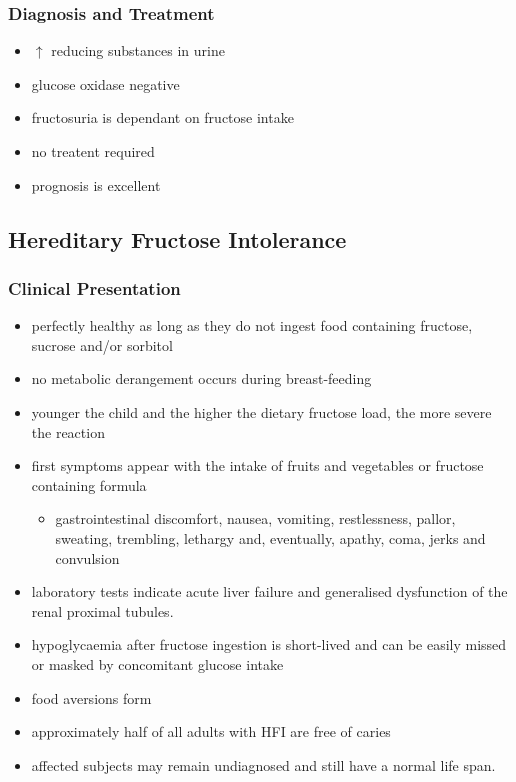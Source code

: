 \documentclass{scrartcl}
\begin{document}
\subsubsection{Diagnosis and Treatment}
\label{sec:org37c1d7e}
\begin{itemize}
\item \(\uparrow\) reducing substances in urine
\item glucose oxidase negative
\item fructosuria is dependant on fructose intake
\item no treatent required
\item prognosis is excellent
\end{itemize}

\subsection{Hereditary Fructose Intolerance}
\label{sec:orgbb3ffac}
\subsubsection{Clinical Presentation}
\label{sec:orgba35513}
\begin{itemize}
\item perfectly healthy as long as they do not ingest food containing fructose, sucrose and/or sorbitol
\item no metabolic derangement occurs during breast-feeding
\item younger the child and the higher the dietary fructose load, the more severe the reaction
\item first symptoms appear with the intake of fruits and vegetables or fructose containing formula
\begin{itemize}
\item gastrointestinal discomfort, nausea, vomiting, restlessness,
pallor, sweating, trembling, lethargy and, eventually, apathy,
coma, jerks and convulsion
\end{itemize}
\item laboratory tests indicate acute liver failure and generalised dysfunction of the renal proximal tubules.
\item hypoglycaemia after fructose ingestion is short-lived and can be easily missed or masked by concomitant glucose intake
\item food aversions form
\item approximately half of all adults with HFI are free of caries
\item affected subjects may remain undiagnosed and still have a normal life span.
\end{itemize}
\end{document}
